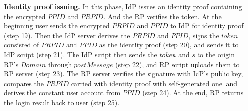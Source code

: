 \vspace{0.5mm}\noindent\textbf{Identity proof issuing.} In this phase, IdP issues an identity proof containing the encrypted $PPID$ and $PRPID$. And the RP verifies the token.
At the beginning user sends the encrypted $PRPID$ and $PPID$ to IdP for identity proof (step 19). 
Then the IdP server derives the $PRPID$ and $PPID$, signs the $token$ consisted of $PRPID$ and $PPID$ as the identity proof (step 20), and sends it to IdP script (step 21). 
The IdP script then sends the $token$ and $s$ to the origin RP's $Domain$ through $postMessage$ (step 22), and  RP script uploads them to RP server (step 23). 
The RP server verifies the signature with IdP's public key, compares the $PRPID$ carried with identity proof with self-generated one, and derives the constant user account from $PPID$ (step 24). 
At the end, RP returns the login result back to user (step 25).

